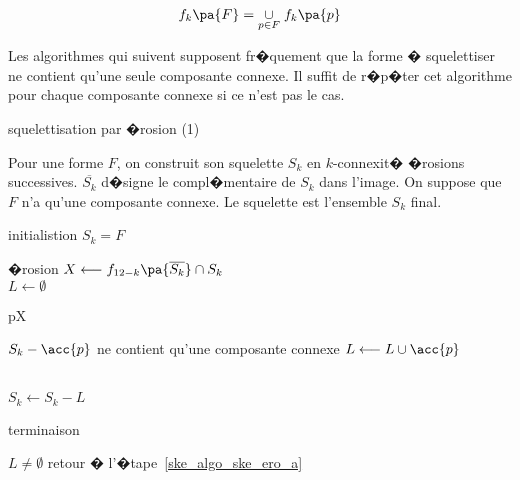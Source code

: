             $$
            f_k \pa{F} = \underset{p \in F}{\cup} \; f_k\pa{p}
            $$
            
Les algorithmes qui suivent supposent fr�quement que la forme � squelettiser ne contient qu'une seule composante connexe. Il suffit de r�p�ter cet algorithme pour chaque composante connexe si ce n'est pas le cas.            
            

        \begin{xalgorithm}{squelettisation par �rosion (1)}
        \label{ske_algo_ske_ero_1}
        
        Pour une forme $F$, on construit son squelette $S_k$ en $k$-connexit� �rosions successives.
        $\overline{S_k}$ d�signe le compl�mentaire de $S_k$ dans l'image. On suppose que $F$ n'a qu'une composante connexe.
        Le squelette est l'ensemble $S_k$ final.
        
        \begin{xalgostep}{initialistion}
                $S_k = F$
        \end{xalgostep}
        
        \begin{xalgostep}{�rosion}\label{ske_algo_ske_ero_a}
                $X \longleftarrow f_{12-k}\pa{\overline{S_k}} \cap S_k$ \\
                $L \longleftarrow \emptyset$ \\
                \begin{xforeach}{p}{X}
                    \begin{xif}{$S_k - \acc{p}$ ne contient qu'une composante connexe}
                        $L \longleftarrow L \cup \acc{p}$
                    \end{xif} 
                \end{xforeach} \\ 
                $S_k \longleftarrow S_k - L$
        \end{xalgostep}
        
        \begin{xalgostep}{terminaison}
                \begin{xif}{$L \neq \emptyset$}
                retour � l'�tape~\ref{ske_algo_ske_ero_a}
                \end{xif}
        \end{xalgostep}
        
        \end{xalgorithm}


